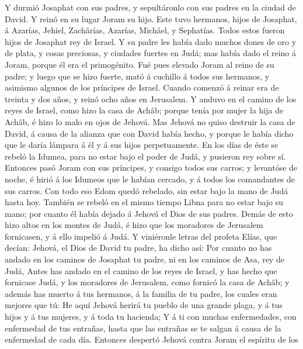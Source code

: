  Y durmió Josaphat con sus padres, y sepultáronlo con sus
padres en la ciudad de David. Y reinó en su lugar Joram su hijo.
 Este tuvo hermanos, hijos de Josaphat, á Azarías, Jehiel,
Zachârías, Azarías, Michâel, y Sephatías. Todos estos fueron hijos de
Josaphat rey de Israel.  Y su padre les había dado muchos
dones de oro y de plata, y cosas preciosas, y ciudades fuertes en Judá;
mas había dado el reino á Joram, porque él era el primogénito.
 Fué pues elevado Joram al reino de su padre; y luego que
se hizo fuerte, mató á cuchillo á todos sus hermanos, y asimismo algunos
de los príncipes de Israel.  Cuando comenzó á reinar era
de treinta y dos años, y reinó ocho años en Jerusalem.  Y
anduvo en el camino de los reyes de Israel, como hizo la casa de Achâb;
porque tenía por mujer la hija de Achâb, é hizo lo malo en ojos de
Jehová.  Mas Jehová no quiso destruir la casa de David, á
causa de la alianza que con David había hecho, y porque le había dicho
que le daría lámpara á él y á sus hijos perpetuamente.  En
los días de éste se rebeló la Idumea, para no estar bajo el poder de
Judá, y pusieron rey sobre sí.  Entonces pasó Joram con
sus príncipes, y consigo todos sus carros; y levantóse de noche, é hirió
á los Idumeos que le habían cercado, y á todos los comandantes de sus
carros.  Con todo eso Edom quedó rebelado, sin estar bajo
la mano de Judá hasta hoy. También se rebeló en el mismo tiempo Libna
para no estar bajo su mano; por cuanto él había dejado á Jehová el Dios
de sus padres.  Demás de esto hizo altos en los montes de
Judá, é hizo que los moradores de Jerusalem fornicasen, y á ello impelió
á Judá.  Y viniéronle letras del profeta Elías, que
decían: Jehová, el Dios de David tu padre, ha dicho así: Por cuanto no
has andado en los caminos de Josaphat tu padre, ni en los caminos de
Asa, rey de Judá,  Antes has andado en el camino de los
reyes de Israel, y has hecho que fornicase Judá, y los moradores de
Jerusalem, como fornicó la casa de Achâb; y además has muerto á tus
hermanos, á la familia de tu padre, los cuales eran mejores que tú:
 He aquí Jehová herirá tu pueblo de una grande plaga, y á
tus hijos y á tus mujeres, y á toda tu hacienda;  Y á ti
con muchas enfermedades, con enfermedad de tus entrañas, hasta que las
entrañas se te salgan á causa de la enfermedad de cada día.
 Entonces despertó Jehová contra Joram el espíritu de los

